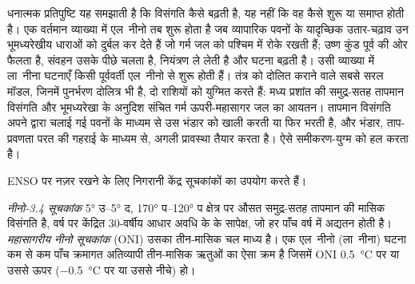 \begin{omfigure}
\centering
{}
\par{}
\end{omfigure}

धनात्मक प्रतिपुष्टि यह समझाती है कि विसंगति कैसे बढ़ती है, यह नहीं कि वह कैसे शुरू या समाप्त होती है। एक वर्तमान
व्याख्या में एल~नीनो तब शुरू होता है जब व्यापारिक पवनों के यादृच्छिक उतार-चढ़ाव उन भूमध्यरेखीय धाराओं को दुर्बल कर देते हैं जो
गर्म जल को पश्चिम में रोके रखती हैं; उष्ण कुंड पूर्व की ओर फैलता है, संवहन उसके पीछे चलता है,
 नियंत्रण ले लेती है और घटना बढ़ती है। उसी व्याख्या में ला~नीना घटनाएँ
किसी पूर्ववर्ती एल~नीनो से शुरू होती हैं। तंत्र को दोलित कराने वाले सबसे सरल मॉडल, जिनमें पुनर्भरण
दोलित्र भी है, दो राशियों को युग्मित करते हैं: मध्य प्रशांत की समुद्र-सतह तापमान विसंगति
और भूमध्यरेखा के अनुदिश संचित गर्म ऊपरी-महासागर जल का आयतन। तापमान
विसंगति अपने द्वारा चलाई गई पवनों के माध्यम से उस भंडार को खाली करती या फिर भरती है, और भंडार,
ताप-प्रवणता परत की गहराई के माध्यम से, अगली प्रावस्था तैयार करता है।  ऐसे
समीकरण-युग्म को हल करता है।

ENSO पर नज़र रखने के लिए निगरानी केंद्र सूचकांकों का उपयोग करते हैं।

\begin{definition}[नीनो-3.4 सूचकांक; महासागरीय नीनो सूचकांक]\label{def:b2:climate-variability:oni}
\emph{नीनो-3.4 सूचकांक} \ang{5} उ--\ang{5} द, \ang{170} प--\ang{120} प क्षेत्र पर औसत
समुद्र-सतह तापमान की मासिक विसंगति है, वर्ष पर केंद्रित 30-वर्षीय आधार अवधि के
 के सापेक्ष, जो हर पाँच वर्ष में अद्यतन होती है।
\emph{महासागरीय नीनो सूचकांक} (ONI) उसका तीन-मासिक चल माध्य है। एक
एल~नीनो (ला~नीना) घटना कम से कम पाँच क्रमागत अतिव्यापी तीन-मासिक ऋतुओं का ऐसा क्रम है
जिसमें ONI \qty{+0.5}{\celsius} पर या उससे ऊपर (\qty{-0.5}{\celsius} पर या उससे नीचे) हो।
\end{definition}

